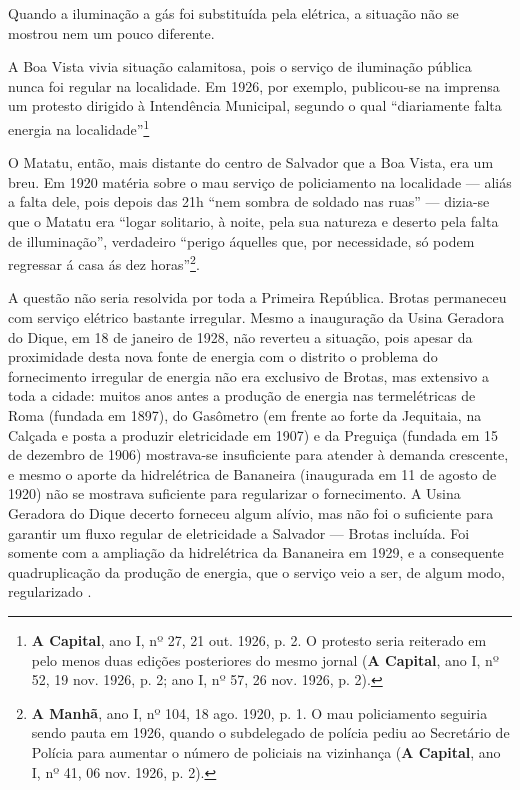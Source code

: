 Quando a iluminação a gás foi substituída pela elétrica, a situação não se mostrou nem um pouco diferente.

A Boa Vista vivia situação calamitosa, pois o serviço de iluminação pública nunca foi regular na localidade. Em 1926, por exemplo, publicou-se na imprensa um protesto dirigido à Intendência Municipal, segundo o qual ``diariamente falta energia na localidade''\footnote{\textbf{A Capital}, ano I, nº 27, 21 out. 1926, p. 2. O protesto seria reiterado em pelo menos duas edições posteriores do mesmo jornal (\textbf{A Capital}, ano I, nº 52, 19 nov. 1926, p. 2; ano I, nº 57, 26 nov. 1926, p. 2).}

O Matatu, então, mais distante do centro de Salvador que a Boa Vista, era um breu. Em 1920 matéria sobre o mau serviço de policiamento na localidade --- aliás a falta dele, pois depois das 21h ``nem sombra de soldado nas ruas'' --- dizia-se que o Matatu era ``logar solitario, à noite, pela sua natureza e deserto pela falta de illuminação'', verdadeiro ``perigo áquelles que, por necessidade, só podem regressar á casa ás dez horas''\footnote{\textbf{A Manhã}, ano I, nº 104, 18 ago. 1920, p. 1. O mau policiamento seguiria sendo pauta em 1926, quando o subdelegado de polícia pediu ao Secretário de Polícia para aumentar o número de policiais na vizinhança (\textbf{A Capital}, ano I, nº 41, 06 nov. 1926, p. 2).}.

A questão não seria resolvida por toda a Primeira República. Brotas permaneceu com serviço elétrico bastante irregular. Mesmo a inauguração da Usina Geradora do Dique, em 18 de janeiro de 1928, não reverteu a situação, pois apesar da proximidade desta nova fonte de energia com o distrito o problema do fornecimento irregular de energia não era exclusivo de Brotas, mas extensivo a toda a cidade: muitos anos antes a produção de energia nas termelétricas de Roma (fundada em 1897), do Gasômetro (em frente ao forte da Jequitaia, na Calçada e posta a produzir eletricidade em 1907) e da Preguiça (fundada em 15 de dezembro de 1906) mostrava-se insuficiente para atender à demanda crescente, e mesmo o aporte da hidrelétrica de Bananeira (inaugurada em 11 de agosto de 1920) não se mostrava suficiente para regularizar o fornecimento. A Usina Geradora do Dique decerto forneceu algum alívio, mas não foi o suficiente para garantir um fluxo regular de eletricidade a Salvador --- Brotas incluída. Foi somente com a ampliação da hidrelétrica da Bananeira em 1929, e a consequente quadruplicação da produção de energia, que o serviço veio a ser, de algum modo, regularizado \cite{reboucas_eletricidade_2018}.

